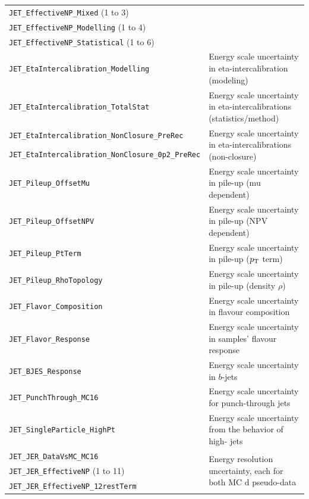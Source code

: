 \begin{table}
{\begin{tabular}{l|l}
  \texttt{JET\_EffectiveNP\_Mixed} (1 to 3)             & \\
  \texttt{JET\_EffectiveNP\_Modelling} (1 to 4)         & \\
  \texttt{JET\_EffectiveNP\_Statistical} (1 to 6)       & \\
  \texttt{JET\_EtaIntercalibration\_Modelling}           & Energy scale uncertainty in eta-intercalibration (modeling) \\
  \texttt{JET\_EtaIntercalibration\_TotalStat}          & Energy scale uncertainty in eta-intercalibrations (statistics/method) \\
  \texttt{JET\_EtaIntercalibration\_NonClosure\_PreRec}  & \multirow{2}{*}{Energy scale uncertainty in eta-intercalibrations (non-closure)} \\
  \texttt{JET\_EtaIntercalibration\_NonClosure\_0p2\_PreRec} & \\
  \texttt{JET\_Pileup\_OffsetMu}                        & Energy scale uncertainty in pile-up (mu dependent) \\
  \texttt{JET\_Pileup\_OffsetNPV}                       & Energy scale uncertainty in pile-up (NPV dependent) \\
  \texttt{JET\_Pileup\_PtTerm}                          & Energy scale uncertainty in pile-up ($p_{\mathrm{T}}$ term) \\
  \texttt{JET\_Pileup\_RhoTopology}                     & Energy scale uncertainty in pile-up (density $\rho$) \\
  \texttt{JET\_Flavor\_Composition}                     & Energy scale uncertainty in flavour composition \\
  \texttt{JET\_Flavor\_Response}                        & Energy scale uncertainty in samples' flavour response \\
  \texttt{JET\_BJES\_Response}                          & Energy scale uncertainty in $b$-jets \\
  \texttt{JET\_PunchThrough\_MC16}                      & Energy scale uncertainty for punch-through jets \\
  \texttt{JET\_SingleParticle\_HighPt}                  & Energy scale uncertainty from the behavior of high-\pt{} jets \\
  \texttt{JET\_JER\_DataVsMC\_MC16}                     & \multirow{3}{*}{Energy resolution uncertainty, each for both MC d pseudo-data} \\
  \texttt{JET\_JER\_EffectiveNP} (1 to 11)              & \\
  \texttt{JET\_JER\_EffectiveNP\_12restTerm}            & \\

\end{tabular}}
\end{table}
